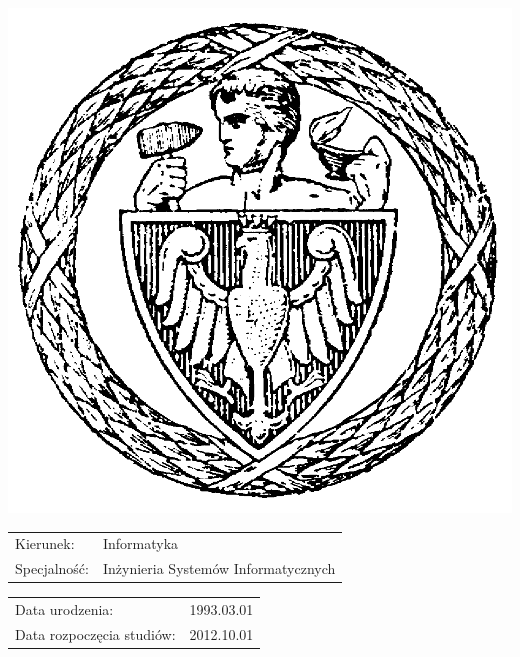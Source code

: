 \begin{minipage}{0.2\textwidth}
    \begin{center}
        \includegraphics[width=\textwidth]{tytulowa_res/logo_pw.png}
    \end{center}
\end{minipage}
\begin{minipage}{0.75\textwidth}
    \begin{flushleft} \normalsize
        \def\arraystretch{2}
            \begin{tabular}{ p{3cm} p{7cm} }
                Kierunek: & Informatyka \\
                Specjalność: & Inżynieria Systemów Informatycznych\\

            \end{tabular}
            \begin{tabular}{p{8cm} r}
                Data urodzenia: & 1993.03.01 \\
                Data rozpoczęcia studiów: & 2012.10.01
            \end{tabular}
    \end{flushleft}
\end{minipage}

~\\[0.2cm]

